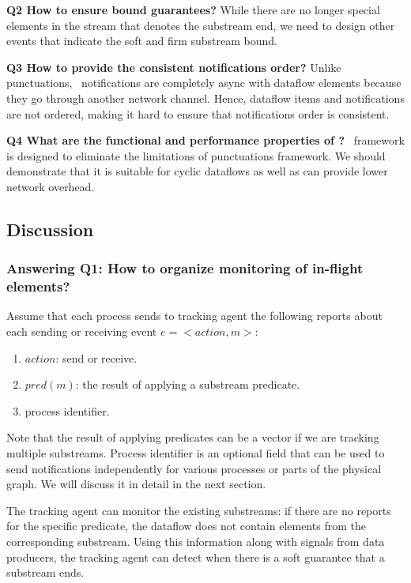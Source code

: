 {\bf Q2 How to ensure bound guarantees?} While there are no longer special elements in the stream that denotes the substream end, we need to design other events that indicate the soft and firm substream bound. 

{\bf Q3 How to provide the consistent notifications order?} Unlike punctuations, \tracker\ notifications are completely async with dataflow elements because they go through another network channel. Hence, dataflow items and notifications are not ordered, making it hard to ensure that notifications order is consistent.

{\bf Q4 What are the functional and performance properties of \tracker?} \tracker\ framework is designed to eliminate the limitations of punctuations framework. We should demonstrate that it is suitable for cyclic dataflows as well as can provide lower network overhead.

\subsection{Discussion}

\subsubsection{Answering Q1: How to organize monitoring of in-flight elements?}
Assume that each process sends to tracking agent the following reports about each sending or receiving event $e = <action,m>$:
\begin{enumerate}
    \item $action$: send or receive.
    \item $pred(m)$: the result of applying a substream predicate.
    \item process identifier.
\end{enumerate}

Note that the result of applying predicates can be a vector if we are tracking multiple substreams. Process identifier is an optional field that can be used to send notifications independently for various processes or parts of the physical graph. We will discuss it in detail in the next section.

The tracking agent can monitor the existing substreams: if there are no reports for the specific predicate, the dataflow does not contain elements from the corresponding substream. Using this information along with signals from data producers, the tracking agent can detect when there is a soft guarantee that a substream ends.


